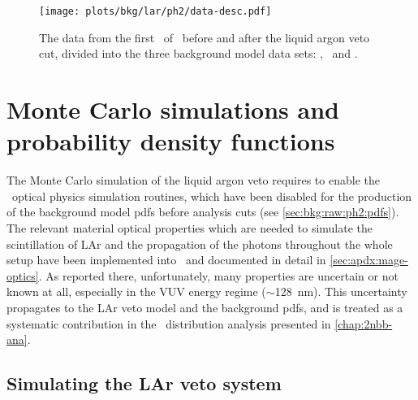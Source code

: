 \begin{figure}
  \centering
  \texttt{[image: plots/bkg/lar/ph2/data-desc.pdf]}
  \caption{%
    The data from the first \gexpophasetwobkg\ of \gerdatwo\ before and after the liquid argon veto
    cut, divided into the three background model data sets: \enrBEGeII, \enrCoaxII\ and
    \enrGeII.
  }\label{fig:bkg:lar:ph2:data-desc}
\end{figure}

\section{Monte Carlo simulations and probability density functions}%
\label{sec:bkg:lar:ph2:pdfs}

The Monte Carlo simulation of the liquid argon veto requires to enable the \geant\ optical
physics simulation routines, which have been disabled for the production of the background
model pdfs before analysis cuts (see \cref{sec:bkg:raw:ph2:pdfs}). The relevant material
optical properties which are needed to simulate the scintillation of LAr and the
propagation of the photons throughout the whole setup have been implemented into \mage\
and documented in detail in \cref{sec:apdx:mage-optics}. As reported there, unfortunately,
many properties are uncertain or not known at all, especially in the VUV energy regime
($\sim$128~nm).  This uncertainty propagates to the LAr veto model and the background
pdfs, and is treated as a systematic contribution in the \nnbb\ distribution analysis
presented in \cref{chap:2nbb-ana}.

\subsection{Simulating the LAr veto system}%
\label{sec:bkg:lar:ph2:heatmap}

